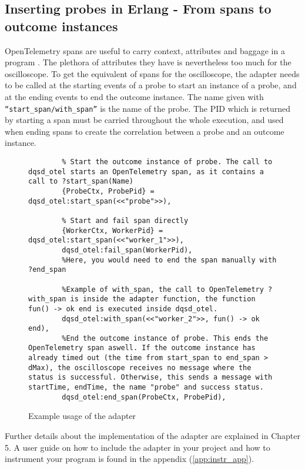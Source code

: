     \subsection{Inserting probes in Erlang - From spans to outcome instances}
        OpenTelemetry spans are useful to carry context, attributes and baggage in a program \cite{otel-dt}. The plethora of attributes they have is nevertheless too much for the oscilloscope. 
        To get the equivalent of spans for the oscilloscope, the adapter needs to be called at the starting events of a probe to start an instance of a probe, and at the ending events to end the outcome instance. The name given with \texttt{``start\_span/with\_span''} is the name of the probe. The PID which is returned by starting a span must be carried throughout the whole execution, and used when ending spans to create the correlation between a probe and an outcome instance.
\begin{figure}[H]
\centering
   \begin{verbatim}
        % Start the outcome instance of probe. The call to dqsd_otel starts an OpenTelemetry span, as it contains a call to ?start_span(Name)
        {ProbeCtx, ProbePid} = dqsd_otel:start_span(<<"probe">>),  

        % Start and fail span directly
        {WorkerCtx, WorkerPid} = dqsd_otel:start_span(<<"worker_1">>),   
        dqsd_otel:fail_span(WorkerPid),
        %Here, you would need to end the span manually with ?end_span

        %Example of with_span, the call to OpenTelemetry ?with_span is inside the adapter function, the function fun() -> ok end is executed inside dqsd_otel.
        dqsd_otel:with_span(<<"worker_2">>, fun() -> ok end), 
        %End the outcome instance of probe. This ends the OpenTelemetry span aswell. If the outcome instance has already timed out (the time from start_span to end_span > dMax), the oscilloscope receives no message where the status is successful. Otherwise, this sends a message with startTime, endTime, the name "probe" and success status.
        dqsd_otel:end_span(ProbeCtx, ProbePid),
        \end{verbatim}
\caption{Example usage of the adapter}\label{code:adapter}
\end{figure}
    Further details about the implementation of the adapter are explained in Chapter 5. A user guide on how to include the adapter in your project and how to instrument your program is found in the appendix (\cref{app:instr_app}). 
